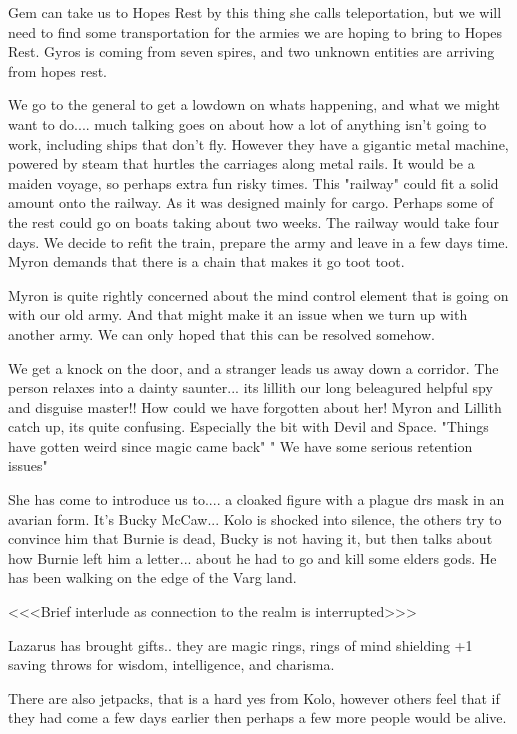 Gem can take us to Hopes Rest by this thing she calls teleportation, but we will need to find some transportation for the armies we are hoping to bring to Hopes Rest. Gyros is coming from seven spires, and two unknown entities are arriving from hopes rest.\medskip

We go to the general to get a lowdown on whats happening, and what we might want to do.... much talking goes on about how a lot of anything isn't going to work, including ships that don't fly. However they have a gigantic metal machine, powered by steam that hurtles the carriages along metal rails. It would be a maiden voyage, so perhaps extra fun risky times. This "railway" could fit a solid amount onto the railway. As it was designed mainly for cargo. Perhaps some of the rest could go on boats taking about two weeks. The railway would take four days. We decide to refit the train, prepare the army and leave in a few days time. Myron demands that there is a chain that makes it go toot toot.\medskip

Myron is quite rightly concerned about the mind control element that is going on with our old army. And that might make it an issue when we turn up with another army. We can only hoped that this can be resolved somehow.\medskip

We get a knock on the door, and a stranger leads us away down a corridor. The person relaxes into a dainty saunter... its lillith our long beleagured helpful spy and disguise master!! How could we have forgotten about her! Myron and Lillith catch up, its quite confusing. Especially the bit with Devil and Space. "Things have gotten weird since magic came back" " We have some serious retention issues"\medskip

She has come to introduce us to.... a cloaked figure with a plague drs mask in an avarian form. It's Bucky McCaw... Kolo is shocked into silence, the others try to convince him that Burnie is dead, Bucky is not having it, but then talks about how Burnie left him a letter... about he had to go and kill some elders gods. He has been walking on the edge of the Varg land.\medskip

<<<Brief interlude as connection to the realm is interrupted>>>\medskip

Lazarus has brought gifts.. they are magic rings, rings of mind shielding +1 saving throws for wisdom, intelligence, and charisma.\medskip

There are also jetpacks, that is a hard yes from Kolo, however others feel that if they had come a few days earlier then perhaps a few more people would be alive.\medskip

